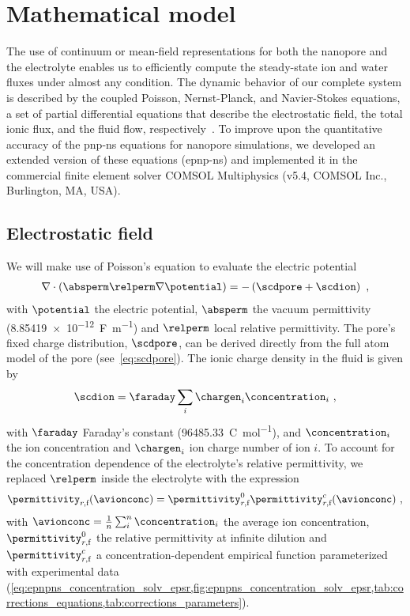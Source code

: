 \section{Mathematical model}
%
\label{sec:epnp-ns:model}
%

The use of continuum or mean-field representations for both the nanopore and the electrolyte enables us to
efficiently compute the steady-state ion and water fluxes under almost any condition. The dynamic behavior of
our complete system is described by the coupled Poisson, Nernst-Planck, and Navier-Stokes equations, a set of
partial differential equations that describe the electrostatic field, the total ionic flux, and the fluid flow,
respectively~\cite{Eisenberg-1996,Cervera-2005,Lu-2012}. To improve upon the quantitative accuracy of the
\gls{pnp-ns} equations for nanopore simulations, we developed an extended version of these equations
({\gls{epnp-ns}}) and implemented it in the commercial finite element solver {COMSOL} Multiphysics (v5.4,
COMSOL Inc., Burlington, MA, USA). 

\subsection{Electrostatic field}
%
\label{sec:epnp-ns:electrostatic_field}
%

We will make use of Poisson's equation to evaluate the electric potential
%
\begin{align}
  \label{eq:poisson}
  \nabla \cdot \left(\absperm \relperm \nabla \potential \right) = -\left( \scdpore + \scdion \right)
  \text{ ,}
\end{align}
%
with $\potential$ the electric potential, $\absperm$ the vacuum permittivity
(\SI{8.85419e-12}{\farad\per\meter}) and $\relperm$ local relative permittivity. The pore's fixed charge
distribution, $\scdpore$,  can be derived directly from the full atom model of the pore
(see~\cref{eq:scdpore}). The ionic charge density in the fluid is given by
%
\begin{align}\label{eq:scdion}
  \scdion = \faraday\sum_{i}\chargen_{i}\concentration_{i}
  \text{ ,}
\end{align}
%
with $\faraday$ Faraday's constant (\SI{96485.33}{\coulomb\per\mole}), and $\concentration_{i}$ the ion
concentration and $\chargen_{i}$ ion charge number of ion $i$. To account for the concentration dependence of
the electrolyte's relative permittivity, we replaced $\relperm$ inside the electrolyte with the expression
%
\begin{align}\label{eq:epnp-ns_relperm_concentration}
  \permittivity_{r,\text{f}}(\avionconc) =
        \permittivity_{r,\text{f}}^0 \permittivity_{r,\text{f}}^c(\avionconc)
  \text{ ,}
\end{align}
%
with $\avionconc=\frac{1}{n}\sum_{i}^{n}\concentration_{i}$ the average ion concentration,
$\permittivity_{r,\text{f}}^0$ the relative permittivity at infinite dilution and
$\permittivity_{r,\text{f}}^c$ a concentration-dependent empirical function parameterized with experimental
data
(\cref{eq:epnpns_concentration_solv_epsr,fig:epnpns_concentration_solv_epsr,tab:corrections_equations,tab:corrections_parameters}).

